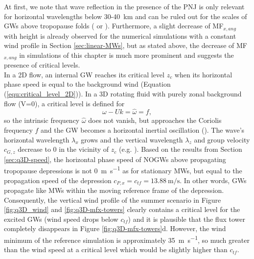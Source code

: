 At first, we note that wave reflection in the presence of the PNJ is only relevant for horizontal wavelengths below 30-\SI{40}{\kilo\meter} and can be ruled out for the scales of GWs above tropopause folds (\cite[]{gill_atmosphere-ocean_1982} or \cite[]{mixa_nonlinear_2021}). Furthermore, a slight decrease of MF$_{x,ang}$ with height is already observed for the numerical simulations with a constant wind profile in Section \ref{sec:linear-MWs}, but as stated above, the decrease of MF$_{x,ang}$ in simulations of this chapter is much more prominent and suggests the presence of critical levels.\\
In a 2D flow, an internal GW reaches its critical level $z_c$ when its horizontal phase speed is equal to the background wind (Equation (\ref{equ:critical_level_2D})). In a 3D rotating fluid with purely zonal background flow (V=0), a critical level is defined for 
\begin{equation}
    \omega - Uk = \hat{\omega} = f,
    \label{equ:critical_level}
\end{equation}
so the intrinsic frequency $\hat{\omega}$ does not vanish, but approaches the Coriolis frequency $f$ and the GW becomes a horizontal inertial oscillation (\cite{jones_propagation_1967}). The wave's horizontal wavelength $\lambda_x$ grows and the vertical wavelength $\lambda_z$ and group velocity $c_{G,z}$ decrease to 0 in the vicinity of $z_c$ (e.g. \cite[]{lin_mesoscale_2007}). Based on the results from Section \ref{sec:q3D-speed}, the horizontal phase speed of NOGWs above propagating tropopause depressions is not \SI{0}{\meter\per\second} as for stationary MWs, but equal to the propagation speed of the depression $c_{P,x}=c_{tf}=\SI{13.88}{\meter\per\second}$. In other words, GWs propagate like MWs within the moving reference frame of the depression. Consequently, the vertical wind profile of the summer scenario in Figure \ref{fig:q3D_wind} and \ref{fig:q3D-mfx-towers} clearly contains a critical level for the excited GWs (wind speed drops below $c_{tf}$) and it is plausible that the flux tower completely disappears in Figure \ref{fig:q3D-mfx-towers}d. However, the wind minimum of the reference simulation is approximately \SI{35}{\meter\per\second}, so much greater than the wind speed at a critical level which would be slightly higher than $c_{tf}$.


